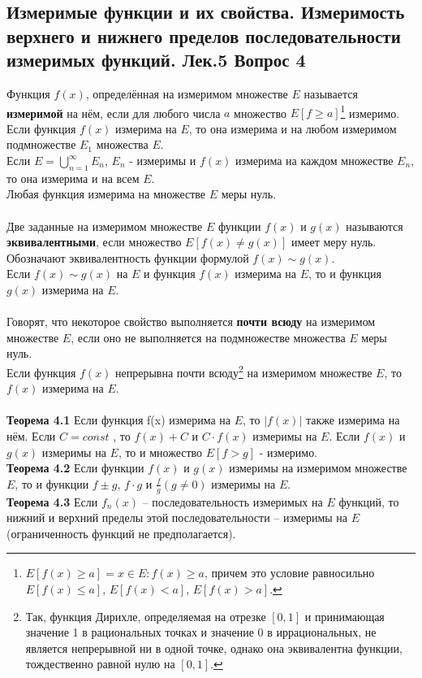 \documentclass{article}
\begin{document}
\subsection{Измеримые функции и их свойства. Измеримость верхнего и нижнего пределов последовательности измеримых функций. Лек.5 \textbf{Вопрос 4}}
	Функция $f(x)$, определённая на измеримом множестве $E$ называется \textbf{измеримой} на нём, если для любого числа $a$ множество $E[f\ge a]$\footnote{$E[f(x)\ge a]={x\in E:f(x)\ge a}$, причем это условие равносильно $E[f(x)\le a]$, $E[f(x)<a]$, $E[f(x)>a]$.} измеримо.\\
	Если функция $f(x)$ измерима на $E$, то она измерима и на любом измеримом подмножестве $E_{1}$ множества $E$.\\
	Если $E=\bigcup_{n=1}^{\infty} E_{n}$, $E_{n}$ - измеримы и $f(x)$ измерима на каждом множестве $E_{n}$, то она измерима и на всем $E$. \\
	Любая функция измерима на множестве $E$ меры нуль.\\
	\\
	Две заданные на измеримом множестве $E$ функции $f(x)$ и $g(x)$ называются \textbf{эквивалентными}, если множество $E[f(x)\ne g(x)]$ имеет меру нуль. Обозначают
	эквивалентность функции формулой $f(x)\sim g(x)$.\\
	Если $f(x)\sim g(x)$ на $E$ и функция $f(x)$ измерима на $E$, то и функция $g(x)$ измерима на $E$.\\
	\\
	Говорят, что некоторое свойство выполняется \textbf{почти всюду} на измеримом множестве $E$, если оно не выполняется на подмножестве множества $E$ меры нуль.\\
	Если функция $f(x)$ непрерывна почти всюду\footnote{Так, функция Дирихле, определяемая на отрезке $[0,1]$ и
	принимающая значение 1 в рациональных точках и значение 0 в иррациональных, не является непрерывной ни в одной точке, однако она эквивалентна функции, тождественно равной нулю на $[0,1]$.} на измеримом множестве $E$, то $f(x)$ измерима на $E$.\\
	\\
	\textbf{Теорема 4.1} Если функция f(x) измерима на $E$, то $|f(x)|$ также измерима на нём. Если $C=const$ , то $f(x)+C$ и $C\cdot f(x)$ измеримы на $E$. Если $f(x) $ и $g(x)$ измеримы на $E$, то	и множество $E[f>g]$ - измеримо.\\
	\textbf{Теорема 4.2} Если функции $f(x)$ и $g(x)$ измеримы на измеримом множестве $E$, то и функции $f\pm g$, $f\cdot g$ и $\frac{f}{g} (g\ne 0)$ измеримы на $E$.\\
	\textbf{Теорема 4.3} Если ${{f}_{n}(x)}$ – последовательность измеримых на $E$ функций, то
	нижний и верхний пределы этой последовательности – измеримы на $E$ (ограниченность функций не предполагается).\\
	
\end{document}
